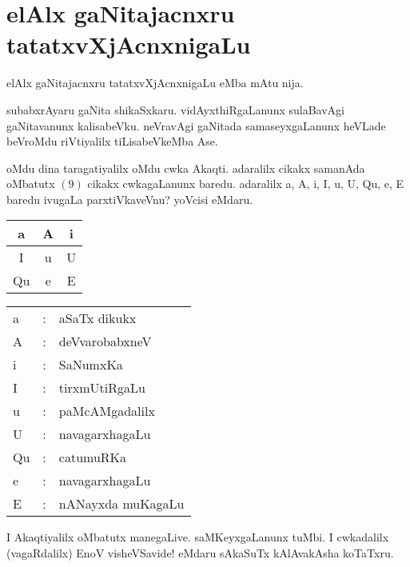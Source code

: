 \chapter{elAlx gaNitajacnxru tatatxvXjAcnxnigaLu}

elAlx gaNitajacnxru tatatxvXjAcnxnigaLu eMba mAtu nija.

subabxrAyaru gaNita shikaSxkaru. vidAyxthiRgaLanunx sulaBavAgi gaNitavanunx kalisabeVku. neVravAgi gaNitada samaseyxgaLanunx heVLade beVroMdu riVtiyalilx tiLisabeVkeMba Ase.

oMdu dina taragatiyalilx oMdu cwka Akaqti. adaralilx cikakx samanAda oMbatutx $(9)$ cikakx cwkagaLanunx baredu. adaralilx a, A, i, I, u, U, Qu, e, E baredu ivugaLa parxtiVkaveVnu? yoVcisi eMdaru.
\begin{center}
\begin{tabular}{|c|c|c|}
\hline
a & A & i\\
\hline
I & u & U\\
\hline
Qu & e & E\\
\hline
\end{tabular}
\end{center}

\begin{tabular}{l@{\;\,}c@{\;\,}l}
a &:& aSaTx dikukx\\
A &:& deVvarobabxneV\\
i &:& SaNumxKa\\
I &:& tirxmUtiRgaLu\\
u &:& paMcAMgadalilx\\
U &:& navagarxhagaLu\\
Qu &:& catumuRKa\\
e &:& navagarxhagaLu\\
E &:& nANayxda muKagaLu
\end{tabular}

\newpage

I Akaqtiyalilx oMbatutx manegaLive. saMKeyxgaLanunx tuMbi. I cwkadalilx (vagaRdalilx) EnoV visheVSavide! eMdaru sAkaSuTx kAlAvakAsha koTaTxru.


